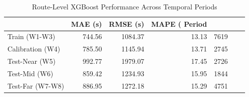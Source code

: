 \begin{table}
\caption{Route-Level XGBoost Performance Across Temporal Periods}
\label{tab:route_xgboost_performance}
\begin{tabular}{lrrrr}
\toprule
 & MAE (s) & RMSE (s) & MAPE (%
Period &  &  &  &  \\
\midrule
Train (W1-W3) & 744.56 & 1084.37 & 13.13 & 7619 \\
Calibration (W4) & 785.50 & 1145.94 & 13.71 & 2745 \\
Test-Near (W5) & 992.77 & 1979.07 & 17.45 & 2726 \\
Test-Mid (W6) & 859.42 & 1234.93 & 15.95 & 1844 \\
Test-Far (W7-W8) & 886.95 & 1272.18 & 15.29 & 4751 \\
\bottomrule
\end{tabular}
\end{table}

